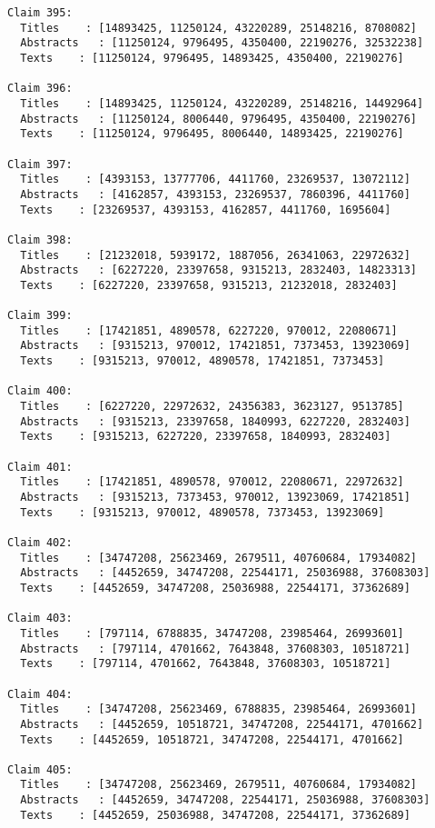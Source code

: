 \documentclass[11pt]{article}
\begin{document}
\begin{Verbatim}[commandchars=\\\{\}]
Claim 395:
  Titles    : [14893425, 11250124, 43220289, 25148216, 8708082]
  Abstracts   : [11250124, 9796495, 4350400, 22190276, 32532238]
  Texts    : [11250124, 9796495, 14893425, 4350400, 22190276]

Claim 396:
  Titles    : [14893425, 11250124, 43220289, 25148216, 14492964]
  Abstracts   : [11250124, 8006440, 9796495, 4350400, 22190276]
  Texts    : [11250124, 9796495, 8006440, 14893425, 22190276]

Claim 397:
  Titles    : [4393153, 13777706, 4411760, 23269537, 13072112]
  Abstracts   : [4162857, 4393153, 23269537, 7860396, 4411760]
  Texts    : [23269537, 4393153, 4162857, 4411760, 1695604]

Claim 398:
  Titles    : [21232018, 5939172, 1887056, 26341063, 22972632]
  Abstracts   : [6227220, 23397658, 9315213, 2832403, 14823313]
  Texts    : [6227220, 23397658, 9315213, 21232018, 2832403]

Claim 399:
  Titles    : [17421851, 4890578, 6227220, 970012, 22080671]
  Abstracts   : [9315213, 970012, 17421851, 7373453, 13923069]
  Texts    : [9315213, 970012, 4890578, 17421851, 7373453]

Claim 400:
  Titles    : [6227220, 22972632, 24356383, 3623127, 9513785]
  Abstracts   : [9315213, 23397658, 1840993, 6227220, 2832403]
  Texts    : [9315213, 6227220, 23397658, 1840993, 2832403]

Claim 401:
  Titles    : [17421851, 4890578, 970012, 22080671, 22972632]
  Abstracts   : [9315213, 7373453, 970012, 13923069, 17421851]
  Texts    : [9315213, 970012, 4890578, 7373453, 13923069]

Claim 402:
  Titles    : [34747208, 25623469, 2679511, 40760684, 17934082]
  Abstracts   : [4452659, 34747208, 22544171, 25036988, 37608303]
  Texts    : [4452659, 34747208, 25036988, 22544171, 37362689]

Claim 403:
  Titles    : [797114, 6788835, 34747208, 23985464, 26993601]
  Abstracts   : [797114, 4701662, 7643848, 37608303, 10518721]
  Texts    : [797114, 4701662, 7643848, 37608303, 10518721]

Claim 404:
  Titles    : [34747208, 25623469, 6788835, 23985464, 26993601]
  Abstracts   : [4452659, 10518721, 34747208, 22544171, 4701662]
  Texts    : [4452659, 10518721, 34747208, 22544171, 4701662]

Claim 405:
  Titles    : [34747208, 25623469, 2679511, 40760684, 17934082]
  Abstracts   : [4452659, 34747208, 22544171, 25036988, 37608303]
  Texts    : [4452659, 25036988, 34747208, 22544171, 37362689]


\end{Verbatim}
\end{document}
